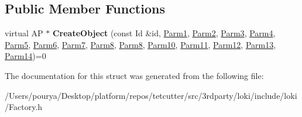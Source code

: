 \subsection*{Public Member Functions}
\begin{DoxyCompactItemize}
\item 
\hypertarget{structLoki_1_1FactoryImpl_3_01AP_00_01Id_00_01Seq_3_01P1_00_01P2_00_01P3_00_01P4_00_01P5_00_01P6850e1763a62dd9e7d17183f42343611c_a96e0a637ce80f0879eed7cd7ca4f8522}{}virtual A\+P $\ast$ {\bfseries Create\+Object} (const Id \&id, \hyperlink{classLoki_1_1EmptyType}{Parm1}, \hyperlink{classLoki_1_1EmptyType}{Parm2}, \hyperlink{classLoki_1_1EmptyType}{Parm3}, \hyperlink{classLoki_1_1EmptyType}{Parm4}, \hyperlink{classLoki_1_1EmptyType}{Parm5}, \hyperlink{classLoki_1_1EmptyType}{Parm6}, \hyperlink{classLoki_1_1EmptyType}{Parm7}, \hyperlink{classLoki_1_1EmptyType}{Parm8}, \hyperlink{classLoki_1_1EmptyType}{Parm8}, \hyperlink{classLoki_1_1EmptyType}{Parm10}, \hyperlink{classLoki_1_1EmptyType}{Parm11}, \hyperlink{classLoki_1_1EmptyType}{Parm12}, \hyperlink{classLoki_1_1EmptyType}{Parm13}, \hyperlink{classLoki_1_1EmptyType}{Parm14})=0\label{structLoki_1_1FactoryImpl_3_01AP_00_01Id_00_01Seq_3_01P1_00_01P2_00_01P3_00_01P4_00_01P5_00_01P6850e1763a62dd9e7d17183f42343611c_a96e0a637ce80f0879eed7cd7ca4f8522}

\end{DoxyCompactItemize}


The documentation for this struct was generated from the following file\+:\begin{DoxyCompactItemize}
\item 
/\+Users/pourya/\+Desktop/platform/repos/tetcutter/src/3rdparty/loki/include/loki/Factory.\+h\end{DoxyCompactItemize}
